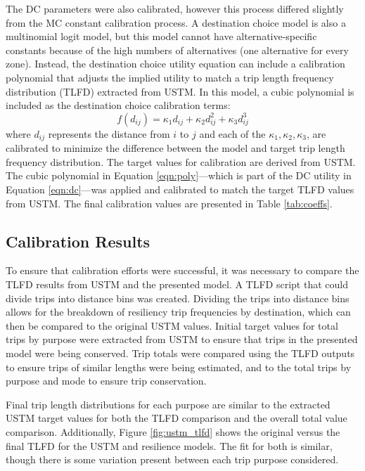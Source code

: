 The DC parameters were also calibrated, however this process differed slightly
from the MC constant calibration process. A destination choice model is also a
multinomial logit model, but this model cannot have alternative-specific
constants because of the high numbers of alternatives (one alternative for
every zone). Instead, the destination choice utility equation can include a
calibration polynomial that adjusts the implied utility to match a trip length
frequency distribution (TLFD) extracted from USTM. In this model, a
cubic polynomial  is included as the destination choice calibration terms:
\begin{equation}
  f(d_{ij}) = \kappa_1 d_{ij} + \kappa_2 d_{ij}^2 + \kappa_3 d_{ij}^3
	\label{eqn:poly}
\end{equation}
where $d_{ij}$ represents the distance from $i$ to $j$
and each of the $\kappa_1,\kappa_2,\kappa_3$, are calibrated to minimize the
difference between the model and target trip length frequency distribution. The target
values for calibration are derived from USTM. The cubic polynomial in
Equation \ref{eqn:poly}---which is part of the DC utility in
Equation \ref{eqn:dc}---was applied and calibrated to match the target TLFD
values from USTM. The final calibration values are presented in Table
\ref{tab:coeffs}.

\subsection{Calibration Results}

To ensure that calibration efforts were successful, it was necessary to
compare the TLFD results from USTM and the presented model. A
TLFD script that could divide trips
into distance bins was created. Dividing the trips into distance bins allows for the
breakdown of resiliency trip frequencies by destination, which can then be
compared to the original USTM values. Initial target values for total
trips by purpose were extracted from USTM to ensure that trips in
the presented model were being conserved. Trip totals were compared using
the TLFD outputs to ensure trips of similar lengths were being estimated,
and to the total trips by purpose and mode to ensure trip conservation.

Final trip length distributions for each purpose are similar to the
extracted USTM target values for both the TLFD comparison and the overall
total value comparison. Additionally, Figure \ref{fig:ustm_tlfd} shows the original versus the final
TLFD for the USTM and resilience models. The fit for both is similar, though
there is some variation present between each trip purpose considered.

